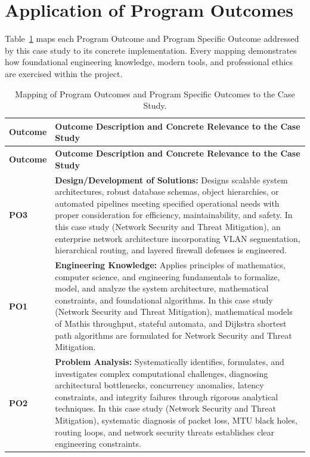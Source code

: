 \section{Application of Program Outcomes}
Table~\ref{tab:po} maps each Program Outcome and Program Specific Outcome addressed by this case study to its concrete implementation. Every mapping demonstrates how foundational engineering knowledge, modern tools, and professional ethics are exercised within the project.

{\small
\begin{longtable}{@{}>{\centering\arraybackslash}p{1.8cm} p{13.2cm}@{}}
    \caption{Mapping of Program Outcomes and Program Specific Outcomes to the Case Study.}\label{tab:po}\\
    \toprule
    \textbf{Outcome} & \textbf{Outcome Description and Concrete Relevance to the Case Study} \\
    \midrule
    \endfirsthead
    \toprule
    \textbf{Outcome} & \textbf{Outcome Description and Concrete Relevance to the Case Study} \\
    \midrule
    \endhead
\textbf{PO3} & \textbf{Design/Development of Solutions:} Designs scalable system architectures, robust database schemas, object hierarchies, or automated pipelines meeting specified operational needs with proper consideration for efficiency, maintainability, and safety. In this case study (Network Security and Threat Mitigation), an enterprise network architecture incorporating VLAN segmentation, hierarchical routing, and layered firewall defenses is engineered. \\
    \addlinespace
\textbf{PO1} & \textbf{Engineering Knowledge:} Applies principles of mathematics, computer science, and engineering fundamentals to formalize, model, and analyze the system architecture, mathematical constraints, and foundational algorithms. In this case study (Network Security and Threat Mitigation), mathematical models of Mathis throughput, stateful automata, and Dijkstra shortest path algorithms are formulated for Network Security and Threat Mitigation. \\
    \addlinespace
\textbf{PO2} & \textbf{Problem Analysis:} Systematically identifies, formulates, and investigates complex computational challenges, diagnosing architectural bottlenecks, concurrency anomalies, latency constraints, and integrity failures through rigorous analytical techniques. In this case study (Network Security and Threat Mitigation), systematic diagnosis of packet loss, MTU black holes, routing loops, and network security threats establishes clear engineering constraints. \\

\end{longtable}}
